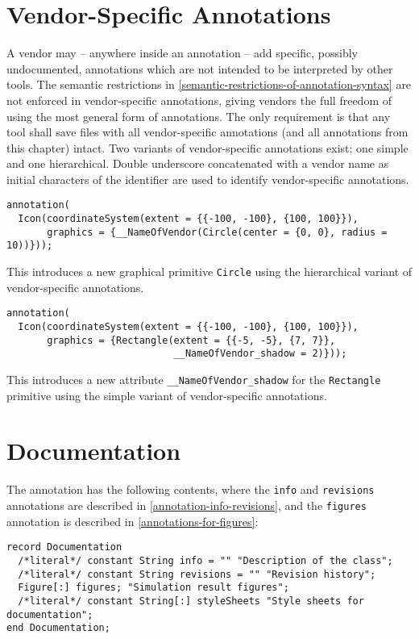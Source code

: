 \section{Vendor-Specific Annotations}\label{vendor-specific-annotations}

A vendor may -- anywhere inside an annotation -- add specific, possibly undocumented, annotations which are not intended to be interpreted by other tools.
The semantic restrictions in \cref{semantic-restrictions-of-annotation-syntax} are not enforced in vendor-specific annotations, giving vendors the full freedom of using the most general form of annotations.
The only requirement is that any tool shall save files with all vendor-specific annotations (and all annotations from this chapter) intact.
Two variants of vendor-specific annotations exist; one simple and one hierarchical.
Double underscore concatenated with a vendor name as initial characters of the identifier are used to identify vendor-specific annotations.

\begin{example}
\begin{lstlisting}[language=modelica]
annotation(
  Icon(coordinateSystem(extent = {{-100, -100}, {100, 100}}),
       graphics = {__NameOfVendor(Circle(center = {0, 0}, radius = 10))}));
\end{lstlisting}
This introduces a new graphical primitive \lstinline!Circle! using the hierarchical variant of vendor-specific annotations.
\begin{lstlisting}[language=modelica]
annotation(
  Icon(coordinateSystem(extent = {{-100, -100}, {100, 100}}),
       graphics = {Rectangle(extent = {{-5, -5}, {7, 7}},
                             __NameOfVendor_shadow = 2)}));
\end{lstlisting}
This introduces a new attribute \lstinline!__NameOfVendor_shadow! for the \lstinline!Rectangle! primitive using the simple variant of vendor-specific annotations.
\end{example}


\section{Documentation}\label{annotations-for-documentation}\label{documentation}

The  annotation has the following contents, where the \lstinline!info! and \lstinline!revisions! annotations are described in \cref{annotation-info-revisions}, and the \lstinline!figures! annotation is described in \cref{annotations-for-figures}:
\begin{lstlisting}[language=modelica]
record Documentation
  /*literal*/ constant String info = "" "Description of the class";
  /*literal*/ constant String revisions = "" "Revision history";
  Figure[:] figures; "Simulation result figures";
  /*literal*/ constant String[:] styleSheets "Style sheets for documentation";
end Documentation;
\end{lstlisting}

